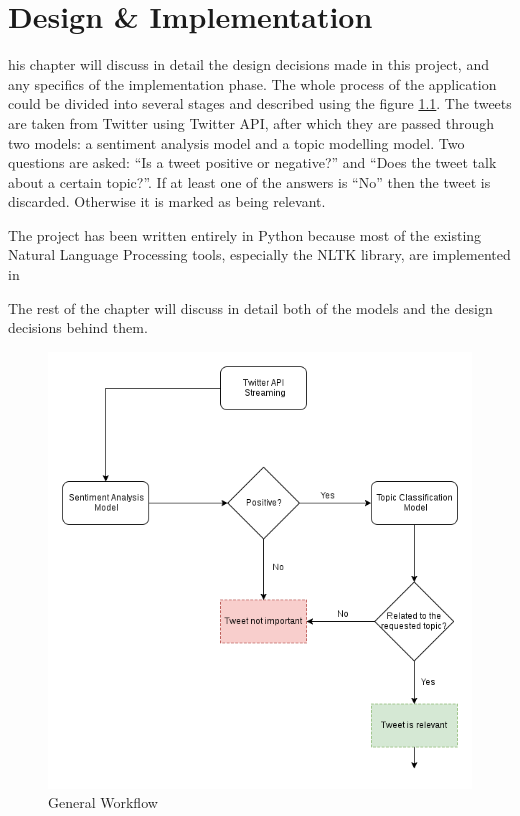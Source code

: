 \let\textcircled=\pgftextcircled
\chapter{Design \& Implementation}
\label{chap:des_imp}

his chapter will discuss in detail the design decisions made in this project, and any specifics of the implementation phase. 
The whole process of the application could be divided into several stages and described using the figure \ref{fig:workflow}. The tweets are taken from Twitter using Twitter API, after which they are passed through two models: a sentiment analysis model and a topic modelling model. Two questions are asked: ``Is a tweet positive or negative?'' and ``Does the tweet talk about a certain topic?''. If at least one of the answers is ``No'' then the tweet is discarded. Otherwise it is marked as being relevant.

The project has been written entirely in Python because most of the existing Natural Language Processing tools, especially the NLTK library, are implemented in 

The rest of the chapter will discuss in detail both of the models and the design decisions behind them. 

\begin{figure}
    \centering
    \includegraphics[width=\textwidth]{workflow}
    \caption{General Workflow}
    \label{fig:workflow}
\end{figure}

